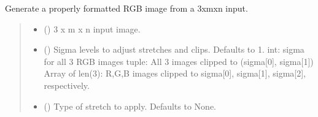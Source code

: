 \documentclass[letterpaper,10pt,english]{sphinxmanual}
\begin{document}
\begin{fulllineitems}
\label{\detokenize{modules:cubespa.utils.normalize}}
\pysigstartsignatures
{}
\pysigstopsignatures
\end{fulllineitems}


\begin{fulllineitems}
\label{\detokenize{modules:cubespa.utils.normalized_rgb_image}}
\pysigstartsignatures
{}
\pysigstopsignatures
\sphinxAtStartPar
Generate a properly formatted RGB image from a 3xmxn input.
\begin{quote}\begin{description}
\begin{itemize}
\item {} 
\sphinxAtStartPar
{} () \textendash{} 3 x m x n input image.

\item {} 
\sphinxAtStartPar
{} (\sphinxstyleliteralemphasis{\sphinxupquote{, }}) \textendash{} Sigma levels to adjust stretches and clips. Defaults to 1.
int: sigma for all 3 RGB images
tuple: All 3 images clipped to (sigma{[}0{]}, sigma{[}1{]})
Array of len(3): R,G,B images clipped to sigma{[}0{]}, sigma{[}1{]}, sigma{[}2{]}, respectively.

\item {} 
\sphinxAtStartPar
{} (\sphinxstyleliteralemphasis{\sphinxupquote{, }}) \textendash{} Type of stretch to apply. Defaults to None.


\end{itemize}
\end{description}
\end{quote}
\end{fulllineitems}
\end{document}
